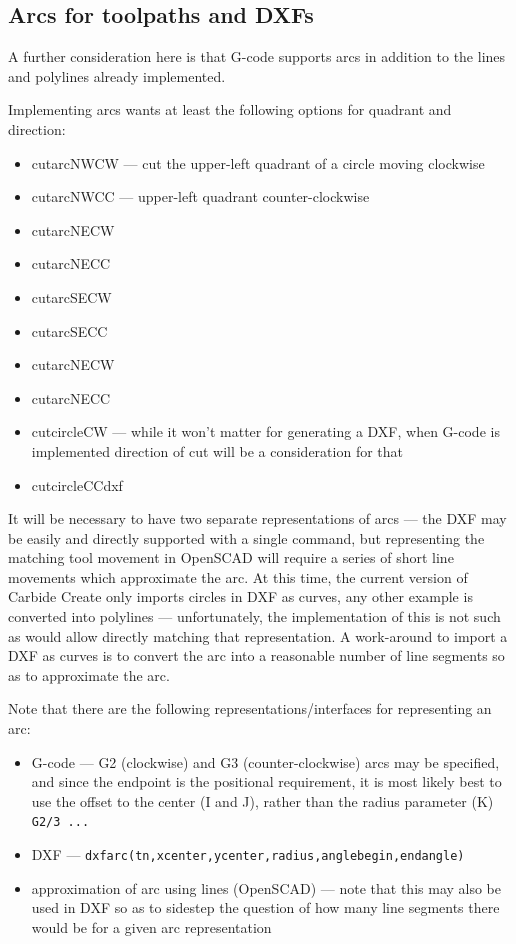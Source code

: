 \documentclass{ltxdoc}
\begin{document}
\subsection{Arcs for toolpaths and DXFs}
 
A further consideration here is that G-code supports arcs in addition to the lines and
polylines already implemented. 

Implementing arcs wants at least the following options for quadrant and direction:
 
\begin{itemize}
\item cutarcNWCW --- cut the upper-left quadrant of a circle moving clockwise
\item cutarcNWCC --- upper-left quadrant counter-clockwise
\item cutarcNECW
\item cutarcNECC
\item cutarcSECW
\item cutarcSECC
\item cutarcNECW
\item cutarcNECC
\item cutcircleCW --- while it won’t matter for generating a DXF, when G-code is implemented
                      direction of cut will be a consideration for that
\item cutcircleCCdxf
\end{itemize}
 
It will be necessary to have two separate representations of arcs --- the DXF may be easily 
and directly supported with a single command, but representing the matching tool movement
in OpenSCAD will require a series of short line movements which approximate the arc. 
At this time, the current version of Carbide Create only imports circles in DXF as curves,
any other example is converted into polylines --- unfortunately, the implementation of this
is not such as would allow directly matching that representation. A work-around to import
a DXF as curves is to convert the arc into a reasonable number of line segments so as to
approximate the arc.
 
\begin{samepage}
Note that there are the following representations/interfaces for representing an arc:
 
\begin{itemize}
\item G-code --- G2 (clockwise) and G3 (counter-clockwise) arcs may be specified, and since 
      the endpoint is the positional requirement, it is most likely best to use the offset 
      to the center (I and J), rather than the radius parameter (K) \texttt{G2/3 ...} 
\item DXF --- \texttt{dxfarc(tn,xcenter,ycenter,radius,anglebegin,endangle)}
\item approximation of arc using lines (OpenSCAD) --- note that this may also be used 
      in DXF so as to sidestep the question of how many line segments there would be
      for a given arc representation 
\end{itemize}
\end{samepage}
 
\end{document}
